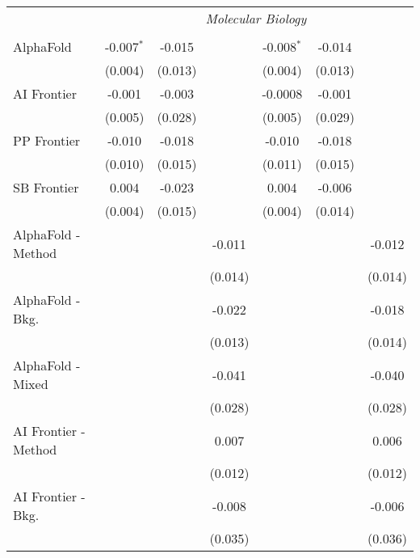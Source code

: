 \begin{tabular}{lcccccc}
 & \multicolumn{6}{c}{\textit{Molecular Biology}} \\ \\
   AlphaFold            & -0.007$^{*}$ & -0.015  &              & -0.008$^{*}$ & -0.014  &   \\   
                        & (0.004)      & (0.013) &              & (0.004)      & (0.013) &   \\   
   AI Frontier          & -0.001       & -0.003  &              & -0.0008      & -0.001  &   \\   
                        & (0.005)      & (0.028) &              & (0.005)      & (0.029) &   \\   
   PP Frontier          & -0.010       & -0.018  &              & -0.010       & -0.018  &   \\   
                        & (0.010)      & (0.015) &              & (0.011)      & (0.015) &   \\   
   SB Frontier          & 0.004        & -0.023  &              & 0.004        & -0.006  &   \\   
                        & (0.004)      & (0.015) &              & (0.004)      & (0.014) &   \\   
   AlphaFold - Method   &              &         & -0.011       &              &         & -0.012\\   
                        &              &         & (0.014)      &              &         & (0.014)\\   
   AlphaFold - Bkg.     &              &         & -0.022       &              &         & -0.018\\   
                        &              &         & (0.013)      &              &         & (0.014)\\   
   AlphaFold - Mixed    &              &         & -0.041       &              &         & -0.040\\   
                        &              &         & (0.028)      &              &         & (0.028)\\   
   AI Frontier - Method &              &         & 0.007        &              &         & 0.006\\   
                        &              &         & (0.012)      &              &         & (0.012)\\   
   AI Frontier - Bkg.   &              &         & -0.008       &              &         & -0.006\\   
                        &              &         & (0.035)      &              &         & (0.036)\\   

\end{tabular}
